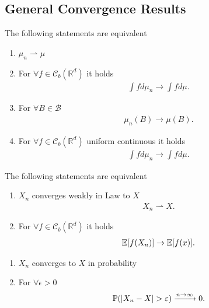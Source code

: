\subsection{General Convergence Results}
\begin{definition}
 The following statements are equivalent   
 \begin{enumerate}
   \item $\mu_n \rightharpoonup \mu $
   \item For $\forall  f \in  \mathcal{C}_b(\mathbb{R}^{d} )$ it holds 
 \begin{align*}
  \int f d\mu_n \to \int  f d\mu 
 .\end{align*}
\item For $\forall  B \in \mathcal{B} $  
  \begin{align*}
    \mu_n(B) \to  \mu(B)
  .\end{align*}
\item For $\forall f \in  \mathcal{C}_b(\mathbb{R}^{d} )$ uniform continuous it holds 
  \begin{align*}
    \int  f d\mu_n \to  \int f d\mu 
  .\end{align*}
 \end{enumerate}
\end{definition}
\begin{definition}
 The following statements are equivalent  
 \begin{enumerate}
   \item $X_n$ converges weakly in Law to $X$  
     \begin{align*}
      X_n \rightharpoonup X
     .\end{align*}
   \item For $\forall f \in  \mathcal{C}_b(\mathbb{R}^{d} )$ it holds 
     \begin{align*}
       \mathbb{E}[f(X_n)] \to \mathbb{E}[f(x)]
     .\end{align*}
 \end{enumerate}
 \begin{enumerate}
   \item $X_n$ converges to $X$ in probability
   \item For $\forall \epsilon  >0$ 
     \begin{align*}
       \mathbb{P}(\lvert X_n - X\rvert >\varepsilon ) \xrightarrow{n\to \infty} 0
     .\end{align*}
 \end{enumerate}
\end{definition}
